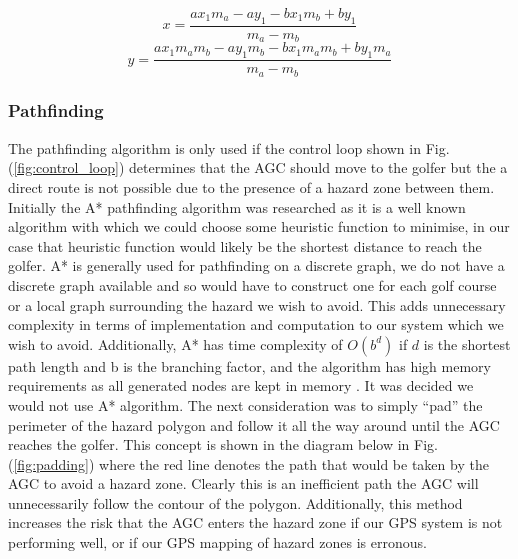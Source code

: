 \documentclass[11pt,landscape]{article}
\begin{document}
\begin{multicols}{3}
\begin{figure}[H]
\begin{mdframed}
    \begin{center}
        \begin{equation}
            x = \frac{ax_{1} m_{a} - ay_{1} - bx_{1} m_{b} + by_{1}}{m_{a} - m_{b}}
            \label{eq:x}
        \end{equation}
        \begin{equation}
            y = \frac{ax_{1} m_{a} m_{b} - ay_{1} m_{b} - bx_{1} m_{a} m_{b} + by_{1} m_{a}}{m_{a} - m_{b}}
            \label{eq:y}
        \end{equation}
    \end{center}
    \end{mdframed}
    \label{fig:segment_calculations}
\end{figure}

\subsubsection{Pathfinding}
The pathfinding algorithm is only used if the control loop shown in Fig.
(\ref{fig:control_loop}) determines that the AGC should move to the golfer but
the a direct route is not possible due to the presence of a hazard zone between
them. Initially the A* pathfinding algorithm was researched as it is a well known algorithm
with which we could choose some heuristic function to minimise, in our case that
heuristic function would likely be the shortest distance to reach the golfer.
 A* is generally used
for pathfinding on a discrete graph, we do not have a discrete graph
available and so would have to construct one for each golf course or a local graph
surrounding the hazard we wish to avoid. This adds unnecessary complexity in
terms of implementation and computation to our system which we wish to avoid.
Additionally, A* has time complexity of $O(b^d)$ if $d$ is the shortest path length
and b is the branching factor, and the algorithm has high memory requirements as all generated
nodes are kept in memory \cite{astar_2009}. It
was decided we would not use A* algorithm. The next consideration was to simply
``pad'' the perimeter of the hazard polygon and follow it all the way around
until the AGC reaches the golfer. This concept is shown in
the diagram below in Fig. (\ref{fig:padding}) where the red line denotes
the path that would be taken by the AGC to avoid a hazard zone. Clearly this is
an inefficient path the AGC will unnecessarily follow the contour of the
polygon. Additionally, this method increases the risk that the AGC enters the
hazard zone if our GPS system is not performing well, or if our GPS mapping of
hazard zones is erronous.  



\end{multicols}
\end{document}
